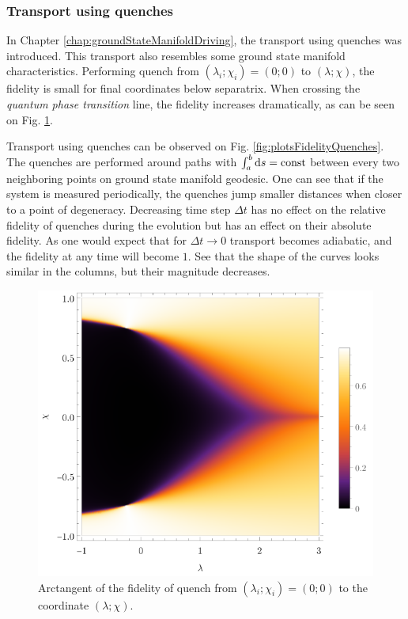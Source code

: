 \subsubsection{Transport using quenches}
In Chapter \ref{chap:groundStateManifoldDriving}, the transport using quenches was introduced. This transport also resembles some ground state manifold characteristics. Performing quench from $(\lambda_i;\chi_i)=(0;0)$ to $(\lambda;\chi)$, the fidelity is small for final coordinates below separatrix. When crossing the \emph{quantum phase transition} line, the fidelity increases dramatically, as can be seen on Fig. \ref{fig:quenchFidelityFrom00}.

Transport using quenches can be observed on Fig. \ref{fig:plotsFidelityQuenches}. The quenches are performed around paths with $\int_{a}^{b} \mathrm{d} s=\text{const}$ between every two neighboring points on ground state manifold geodesic. One can see that if the system is measured periodically, the quenches jump smaller distances when closer to a point of degeneracy. Decreasing time step $\Delta t$ has no effect on the relative fidelity of quenches during the evolution but has an effect on their absolute fidelity. As one would expect that for $\Delta t\rightarrow 0$ transport becomes adiabatic, and the fidelity at any time will become $1$. See that the shape of the curves looks similar in the columns, but their magnitude decreases.

\begin{figure}[H]
    \centering
    \includegraphics[scale=1.2]{../img/quenchFidelityFrom00.pdf}
    \caption{Arctangent of the fidelity of quench from $(\lambda_i;\chi_i)=(0;0)$ to the coordinate $(\lambda;\chi)$.}
    \label{fig:quenchFidelityFrom00}    
\end{figure}


